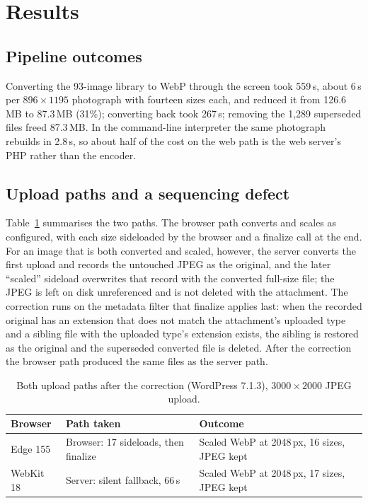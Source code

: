 \documentclass[sigconf,nonacm,screen]{acmart}
\begin{document}
\section{Results}

\subsection{Pipeline outcomes}

Converting the 93-image library to WebP through the screen took 559\,s, about 6\,s per $896\times1195$ photograph with fourteen sizes each, and reduced it from 126.6\,MB to 87.3\,MB (31\%); converting back took 267\,s; removing the 1,289 superseded files freed 87.3\,MB. In the command-line interpreter the same photograph rebuilds in 2.8\,s, so about half of the cost on the web path is the web server's PHP rather than the encoder.

\subsection{Upload paths and a sequencing defect}
\label{sec:paths}

Table~\ref{tab:paths} summarises the two paths. The browser path converts and scales as configured, with each size sideloaded by the browser and a finalize call at the end. For an image that is both converted and scaled, however, the server converts the first upload and records the untouched JPEG as the original, and the later ``scaled'' sideload overwrites that record with the converted full-size file; the JPEG is left on disk unreferenced and is not deleted with the attachment. The correction runs on the metadata filter that finalize applies last: when the recorded original has an extension that does not match the attachment's uploaded type and a sibling file with the uploaded type's extension exists, the sibling is restored as the original and the superseded converted file is deleted. After the correction the browser path produced the same files as the server path.

\begin{table}[t]
\caption{Both upload paths after the correction (WordPress 7.1.3), $3000\times2000$ JPEG upload.}
\label{tab:paths}
\small
\begin{tabularx}{\columnwidth}{@{}lXX@{}}
\toprule
Browser & Path taken & Outcome \\
\midrule
Edge 155 & Browser: 17 sideloads, then finalize & Scaled WebP at 2048\,px, 16 sizes, JPEG kept \\
WebKit 18 & Server: silent fallback, 66\,s & Scaled WebP at 2048\,px, 17 sizes, JPEG kept \\
\bottomrule
\end{tabularx}
\end{table}
\end{document}
